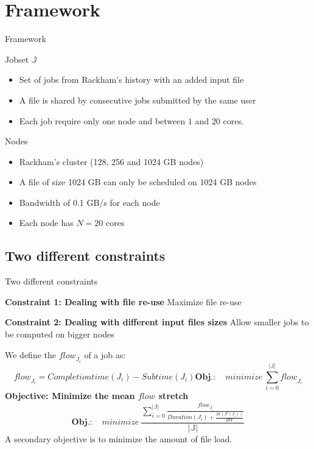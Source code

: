 \documentclass{libs/ufc_format}
\newcommand{\flow}[1]{\ensuremath{\mathit{flow}_{#1}}\xspace}
\newcommand{\inputs}{\ensuremath{\mathcal{F}}\xspace}
\newcommand{\memory}{\ensuremath{\mathcal{M}}\xspace}
\newcommand{\duration}{\mathit{Duration}\xspace}
\newcommand{\bandwidth}{\mathit{BW}\xspace}
\newcommand{\submissiontime}{\mathit{Subtime}\xspace}
\newcommand{\completiontime}{\mathit{Completiontime}\xspace}
\newcommand{\jobset}{\ensuremath{\mathbb{J}}\xspace}
\begin{document}
{\section{Framework}
\begin{frame}{Framework}
	\begin{block}{Jobset \jobset}
		\begin{itemize}
			\item Set of jobs from Rackham's history with an added input file
			\item A file is shared by consecutive jobs submitted by the same user
			\item Each job require only one node and between $1$ and $20$ cores.
		\end{itemize}
	\end{block}
	\begin{block}{Nodes}
		\begin{itemize}
			\item Rackham's cluster (128, 256 and 1024 GB nodes)
			\item A file of size 1024 GB can only be scheduled on 1024 GB nodes
			\item Bandwidth of 0.1 GB/s for each node
			\item Each node has $N = 20$ cores
		\end{itemize}
	\end{block}
\end{frame}


\subsection{Two different constraints}
\begin{frame}{Two different constraints}

\begin{block}{\bf Constraint 1: Dealing with file re-use}
	Maximize file re-use
\end{block}

\begin{block}{\bf Constraint 2: Dealing with different input files sizes}
	Allow smaller jobs to be computed on bigger nodes
\end{block}

		We define the \flow{J_i} of a job as:
		$$
			\flow{J_i} = \completiontime(J_i) - \submissiontime(J_i)
			\textbf{Obj.}: \quad \mathit{minimize}~\sum_{i=0}^{|\jobset|}\flow{J_i}
		$$
		\textbf{Objective: Minimize the mean \flow{} stretch}
		$$
			\textbf{Obj.}: \quad \mathit{minimize}~\frac{\sum_{i=0}^{|\jobset|}\frac{\flow{J_i}}{\duration(J_i) + \frac{\memory(\inputs(J_i))}{\bandwidth}}}{|\jobset|}
		$$
A secondary objective is to minimize the amount of file load.



\end{frame}}
\end{document}
